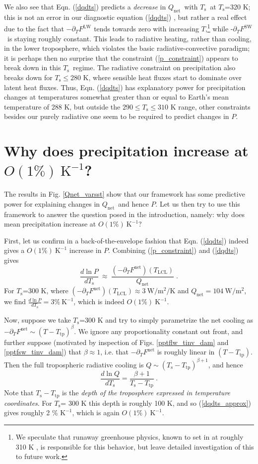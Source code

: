 \documentclass[10pt]{article}
\newcommand{\beqn}{\begin{equation}}
\newcommand{\eeqn}{\end{equation}}
\newcommand{\eqnref}[1]{(\ref{#1})}
\newcommand{\ppt}{\ensuremath{\partial_T}}
\newcommand{\Qnet}{\ensuremath{Q_\mathrm{net}}}
\newcommand{\FLW}{\ensuremath{F^\mathrm{LW}}}
\newcommand{\FSW}{\ensuremath{F^\mathrm{SW}}}
\newcommand{\Fnet}{\ensuremath{F^\mathrm{net}}}
\newcommand{\Wmsq}{\ensuremath{\mathrm{W/m^2}}}
\newcommand{\Ts}{\ensuremath{T_\mathrm{s}}}
\newcommand{\Tlcl}{\ensuremath{T_\mathrm{LCL}}}
\newcommand{\Ttp}{\ensuremath{T_\mathrm{tp}}}
\newcommand{\Kinverse}{\ensuremath{\mathrm{K^{-1}}}}
\begin{document}
We also see that  Eqn. \eqnref{dqdts} predicts a \emph{decrease} in  \Qnet\ with \Ts\ at \Ts=320 K; this is not an error in our diagnostic equation \eqnref{dqdts} , but rather a real effect due to the fact that $-\ppt \FLW$ tends towards zero with increasing $T$,\footnote{We speculate that runaway greenhouse physics, known to set in at roughly 310 K \citep{goldblatt2013}, is responsible for this behavior, but leave detailed investigation of this to future work.} while -\ppt \FSW\ is staying roughly constant. This leads to radiative heating, rather than cooling, in the  lower troposphere, which violates the basic radiative-convective paradigm; it is perhaps then no surprise that the constraint \eqnref{p_constraint} appears to break down in this \Ts\ regime. The radiative constraint on precipitation also breaks down for $\Ts \leq 280$ K, where sensible heat fluxes start to dominate over latent heat fluxes. Thus, Eqn. \eqnref{dqdts} has explanatory power for  precipitation changes at  temperatures somewhat greater than or equal to Earth's mean temperature of 288 K, but outside the $290\leq \Ts \leq 310$ K range, other constraints besides our purely radiative one seem to be required to predict changes in $P$.


\section{Why does precipitation increase at $O(1\%)\ \Kinverse$?} \label{sec_1percent}
The results in Fig. \ref{Qnet_varsst} show that our framework  has some predictive power for explaining changes in \Qnet\ and hence $P$. Let us then try to use this framework to answer the question posed in the introduction, namely: why does mean precipitation increase at $O(1\%)\ \Kinverse$?

First, let us confirm in a back-of-the-envelope fashion that Eqn. \eqnref{dqdts} indeed gives a $O(1\%)\ \Kinverse$ increase in $P$. Combining \eqnref{p_constraint} and \eqnref{dqdts} gives
	\beqn
		\frac{d \ln  P}{d \Ts} \ \approx\  \frac{(-\ppt \Fnet)(\Tlcl)}{\Qnet} \; .
	\label{precip_estimate}
	\eeqn
For \Ts=300 K, where $(-\ppt \Fnet)(\Tlcl) \approx 3 \ \Wmsq/\mathrm{K}$ and $\Qnet =  104\ \Wmsq$, we find $\frac{d \ln  P}{d \Ts}=  3\%\ \Kinverse$, which is indeed  $O(1\%)\ \Kinverse$.

Now, suppose we take \Ts=300 K and  try to simply parametrize the net cooling as $-\ppt \Fnet \sim (T-\Ttp)^\beta$. We ignore any proportionality constant out front, and further suppose (motivated by inspection of Figs. \ref{pptflw_tinv_dam} and \ref{pptfsw_tinv_dam})  that $\beta \approx 1$, i.e. that $-\ppt \Fnet$ is roughly linear in $(T-\Ttp)$. Then the full tropospheric radiative cooling is $Q\sim (\Ts-\Ttp)^{\beta+1}$, and hence 
	\beqn
		\frac{d \ln Q}{d \Ts}  =  \frac{\beta+1}{\Ts-\Ttp}\ . \label{dqdts_approx}
	\eeqn
Note that $\Ts-\Ttp$ is the \emph{depth of the troposphere expressed in temperature coordinates}. For  \Ts= 300 K this depth is roughly 100 K, and so \eqnref{dqdts_approx} gives roughly 2 \% \Kinverse, which is again $O(1\%)\ \Kinverse$.
\end{document}
